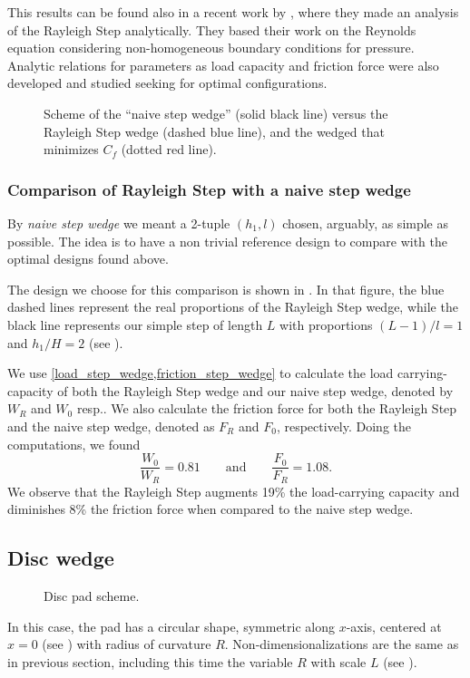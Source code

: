 This results can be found also in a recent work by \citeauthor{rahmani2009} \cite{rahmani2009}, where they made an analysis of the Rayleigh Step analytically. They based their work on the Reynolds equation considering non-homogeneous boundary conditions for pressure. Analytic relations for parameters as load capacity and friction force were also developed and studied seeking for optimal configurations.
\begin{figure}[ht]
 \centering 
 \def\svgwidth{\textwidth}	

\caption[Scheme of the ``naive step wedge'' versus the Rayleigh Step wedge]{Scheme of the ``naive step wedge'' (solid black line) versus the Rayleigh Step wedge (dashed blue line), and the wedged that minimizes $C_f$ (dotted red line).}\label{fig:step_wedge_comp}	
\end{figure}
\subsubsection*{Comparison of Rayleigh Step with a naive step wedge}
By \emph{naive step wedge} we meant a 2-tuple $(h_1,l)$ chosen, arguably, as simple as possible. The idea is to have a non trivial reference design to compare with the optimal designs found above.

The design we choose for this comparison is shown in . In that figure, the blue dashed lines represent the real proportions of the Rayleigh Step wedge, while the black line represents our simple step of length $L$ with proportions $(L-1)/l=1$ and $h_1/H=2$ (see ).

We use \eqref{load_step_wedge,friction_step_wedge} to calculate the load carrying-capacity of both the Rayleigh Step wedge and our naive step wedge, denoted by $W_R$ and $W_0$ resp.. We also calculate the friction force for both the Rayleigh Step and the naive step wedge, denoted as $F_R$ and $F_0$, respectively. Doing the computations, we found
$$\frac{W_0}{W_R}=0.81\qquad\text{and}\qquad\frac{F_0}{F_R}=1.08.$$
We observe that the Rayleigh Step augments 19\% the load-carrying capacity and diminishes 8\% the friction force when compared to the naive step wedge.

\subsection{Disc wedge}\label{sec:disc_wedge}
 \begin{figure}[ht!]
 \centering 
 \def\svgwidth{\textwidth}	
\caption{Disc pad scheme.}\label{fig:pad_disc_nocav}
\end{figure}
In this case, the pad has a circular shape, symmetric along $x$-axis, centered at $x=0$ (see ) with radius of curvature $R$. Non-dimensionalizations are the same as in previous section, including this time the variable $R$ with scale $L$ (see ).

